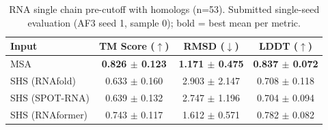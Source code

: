 \begin{table}[htbp]
\centering
\caption{RNA single chain pre-cutoff with homologs (n=53). Submitted single-seed evaluation (AF3 seed 1, sample 0); bold = best mean per metric.}
\label{tab:rna_single_chain_pre_cutoff_with_homologs}
\begin{tabular}{lccc}
\toprule
Input & TM Score ($\uparrow$) & RMSD ($\downarrow$) & LDDT ($\uparrow$) \\
\midrule
MSA & \textbf{0.826 $\pm$ 0.123} & \textbf{1.171 $\pm$ 0.475} & \textbf{0.837 $\pm$ 0.072} \\
SHS (RNAfold) & 0.633 $\pm$ 0.160 & 2.903 $\pm$ 2.147 & 0.708 $\pm$ 0.118 \\
SHS (SPOT-RNA) & 0.639 $\pm$ 0.132 & 2.747 $\pm$ 1.196 & 0.704 $\pm$ 0.094 \\
SHS (RNAformer) & 0.743 $\pm$ 0.117 & 1.612 $\pm$ 0.571 & 0.782 $\pm$ 0.082 \\
\bottomrule
\end{tabular}
\end{table}
